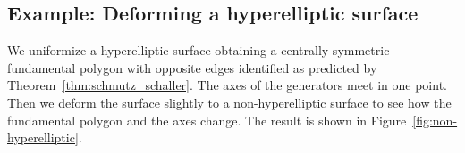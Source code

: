 \documentclass[Thesis]{subfiles}
\begin{document}


\subsection{Example: Deforming a hyperelliptic surface}
\label{sec:non-hyperelliptic}

We uniformize a hyperelliptic surface obtaining a centrally symmetric
fundamental polygon with opposite edges identified as predicted by
Theorem~\ref{thm:schmutz_schaller}. The axes of the generators meet in
one point. Then we deform the surface slightly to a non-hyperelliptic
surface to see how the fundamental polygon and the axes change. The
result is shown in Figure~\ref{fig:non-hyperelliptic}.
\end{document}
